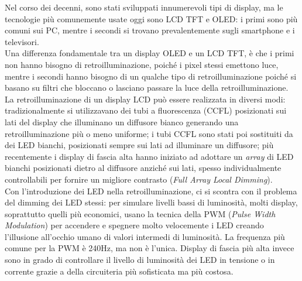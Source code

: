 Nel corso dei decenni, sono stati sviluppati innumerevoli tipi di display, ma le tecnologie più comunemente usate oggi sono LCD TFT e OLED: i primi sono più comuni sui PC, mentre i secondi si trovano prevalentemente sugli smartphone e i televisori.\\
Una differenza fondamentale tra un display OLED e un LCD TFT, è che i primi non hanno bisogno di retroilluminazione, poiché i pixel stessi emettono luce, mentre i secondi hanno bisogno di un qualche tipo di retroilluminazione poiché si basano su filtri che bloccano o lasciano passare la luce della retroilluminazione.\\
La retroilluminazione di un display LCD può essere realizzata in diversi modi: tradizionalmente si utilizzavano dei tubi a fluorescenza (CCFL) posizionati sui lati del display che illuminano un diffusore bianco generando una retroilluminazione più o meno uniforme; i tubi CCFL sono stati poi sostituiti da dei LED bianchi, posizionati sempre sui lati ad illuminare un diffusore; più recentemente i display di fascia alta hanno iniziato ad adottare un \textit{array} di LED bianchi posizionati dietro al diffusore anziché sui lati, spesso individualmente controllabili per fornire un migliore contrasto (\textit{Full Array Local Dimming}).\\
Con l'introduzione dei LED nella retroilluminazione, ci si scontra con il problema del dimming dei LED stessi: per simulare livelli bassi di luminosità, molti display, soprattutto quelli più economici, usano la tecnica della PWM (\textit{Pulse Width Modulation}) per accendere e spegnere molto velocemente i LED creando l'illusione all'occhio umano di valori intermedi di luminosità. La frequenza più comune per la PWM è 240Hz, ma non è l'unica. Display di fascia più alta invece sono in grado di controllare il livello di luminosità dei LED in tensione o in corrente grazie a della circuiteria più sofisticata ma più costosa.

